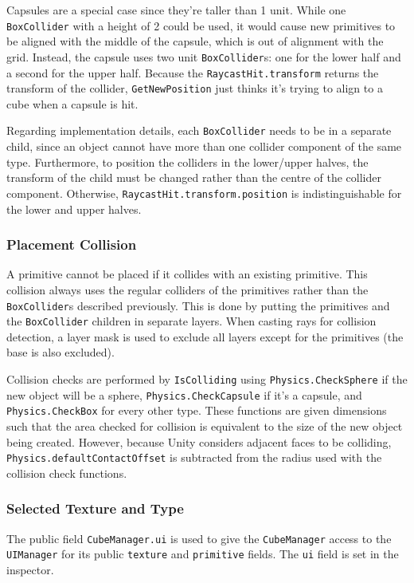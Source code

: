 \documentclass[a4paper, 12pt]{scrartcl}
\begin{document}
Capsules are a special case since they're taller than 1 unit. While one \texttt{BoxCollider} with a height of 2 could be used, it would cause new primitives to be aligned with the middle of the capsule, which is out of alignment with the grid. Instead, the capsule uses two unit \texttt{BoxCollider}s: one for the lower half and a second for the upper half. Because the \texttt{RaycastHit.transform} returns the transform of the collider, \texttt{GetNewPosition} just thinks it's trying to align to a cube when a capsule is hit.

Regarding implementation details, each \texttt{BoxCollider} needs to be in a separate child, since an object cannot have more than one collider component of the same type. Furthermore, to position the colliders in the lower/upper halves, the transform of the child must be changed rather than the centre of the collider component. Otherwise, \texttt{RaycastHit.transform.position} is indistinguishable for the lower and upper halves.

\subsubsection{Placement Collision}
A primitive cannot be placed if it collides with an existing primitive. This collision always uses the regular colliders of the primitives rather than the \texttt{BoxCollider}s described previously. This is done by putting the primitives and the \texttt{BoxCollider} children in separate layers. When casting rays for collision detection, a layer mask is used to exclude all layers except for the primitives (the base is also excluded).

Collision checks are performed by \texttt{IsColliding} using \texttt{Physics.CheckSphere} if the new object will be a sphere, \texttt{Physics.CheckCapsule} if it's a capsule, and \texttt{Physics.CheckBox} for every other type. These functions are given dimensions such that the area checked for collision is equivalent to the size of the new object being created. However, because Unity considers adjacent faces to be colliding, \texttt{Physics.defaultContactOffset} is subtracted from the radius used with the collision check functions.

\subsubsection{Selected Texture and Type}
The public field \texttt{CubeManager.ui} is used to give the \texttt{CubeManager} access to the \texttt{UIManager} for its public \texttt{texture} and \texttt{primitive} fields. The \texttt{ui} field is set in the inspector.
\end{document}

